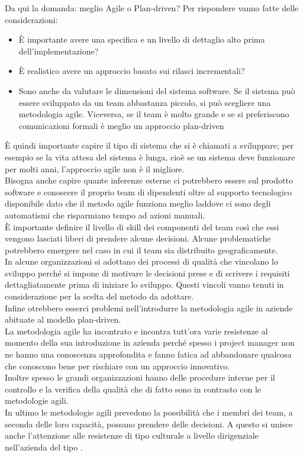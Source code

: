 Da qui la domanda: meglio Agile o Plan-driven?
Per rispondere vanno fatte delle considerazioni:
\begin{itemize}[noitemsep]
    \item È importante avere una specifica e un livello di dettaglio alto prima dell'implementazione?
    \item È realistico avere un approccio basato sui rilasci incrementali?
    \item Sono anche da valutare le dimensioni del sistema software. Se il sistema può essere sviluppato da un team abbastanza piccolo, si può scegliere una metodologia agile. Viceversa, se il team è molto grande e se si preferiscono comunicazioni formali è meglio un approccio plan-driven
\end{itemize}
È quindi importante capire il tipo di sistema che si è chiamati a sviluppare; per esempio se la vita attesa del sistema è lunga, cioè se un sistema deve funzionare per molti anni, l'approccio agile non è il migliore.\\
Bisogna anche capire quante inferenze esterne ci potrebbero essere sul prodotto software e conoscere il proprio team di dipendenti oltre al supporto tecnologico disponibile dato che il metodo agile funziona meglio laddove ci sono degli automatismi che risparmiano tempo ad azioni manuali.\\
È importante definire il livello di skill dei componenti del team così che essi vengono lasciati liberi di prendere alcune decisioni.
Alcune problematiche potrebbero emergere nel caso in cui il team sia distribuito geograficamente.\\
In alcune organizzazioni si adottano dei processi di qualità che vincolano lo sviluppo perché si impone di motivare le decisioni prese e di scrivere i requisiti dettagliatamente prima di iniziare lo sviluppo.
Questi vincoli vanno tenuti in considerazione per la scelta del metodo da adottare.\\
Infine otrebbero esserci problemi nell'introdurre la metodologia agile in aziende abituate al modello plan-driven.\\
La metodologia agile ha incontrato e incontra tutt'ora varie resistenze al momento della sua introduzione in azienda perché spesso i project manager non ne hanno una conoscenza approfondita e fanno fatica ad abbandonare qualcosa che conoscono bene per rischiare con un approccio innovativo.\\
Inoltre spesso le grandi organizzazioni hanno delle procedure interne per il controllo e la verifica della qualità che di fatto sono in contrasto con le metodologie agili.\\
In ultimo le metodologie agili prevedono la possibilità che i membri dei team, a seconda delle loro capacità, possano prendere delle decisioni.
A questo si unisce anche l'attenzione alle resistenze di tipo culturale a livello dirigenziale nell'azienda del tipo .